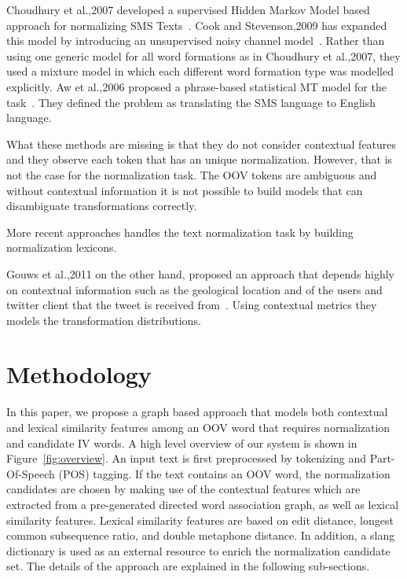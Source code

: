 \documentclass[preprint,review,12pt]{elsarticle}
\begin{document}
Choudhury et al.,2007 developed a supervised Hidden Markov Model based approach for normalizing SMS Texts~\cite{Choudhury:2007:IMS:1326044.1326048}. Cook and Stevenson,2009 has expanded this model by introducing an unsupervised noisy channel model~\cite{Cook:2009:UMT:1642011.1642021}. Rather than using one generic model for all word formations as in Choudhury et al.,2007, they used a mixture model in which each different word formation type was modelled explicitly. Aw et al.,2006 proposed a phrase-based statistical MT model for the task~\cite{Aw:2006:PSM:1273073.1273078}. They defined the problem as translating the SMS language to English language.

What these methods are missing is that they do not consider contextual features and they observe each token that has an unique normalization. However, that is not the case for the normalization task. The OOV tokens are ambiguous and without contextual information it is not possible to build models that can disambiguate transformations correctly.

More recent approaches handles the text normalization task by building normalization lexicons.
\cite{Han:2011:LNS:2002472.2002520}

\cite{DBLP:conf/acl/HassanM13}

Gouws et al.,2011 on the other hand, proposed an approach that depends highly on contextual information such as the geological location and of the users and twitter client that the tweet is received from~\cite{Gouws:2011:CBL:2021109.2021113}. Using contextual metrics they models the transformation distributions.

\section{Methodology}
\label{sec:method}



In this paper, we propose a graph based approach that models both contextual and lexical similarity features among an OOV word that requires normalization and candidate IV words. A high level overview of our system is shown in Figure~\ref{fig:overview}. An input text is first preprocessed by tokenizing and Part-Of-Speech (POS) tagging. If the text contains an OOV word, the normalization candidates are chosen by making use of the contextual features which are extracted from a pre-generated directed word association graph, as well as lexical similarity features. Lexical similarity features are based on edit distance, longest common subsequence ratio, and double metaphone distance. In addition, a slang dictionary is used as an external resource to enrich the normalization candidate set. The details of the approach are explained in the following sub-sections.
\end{document}
